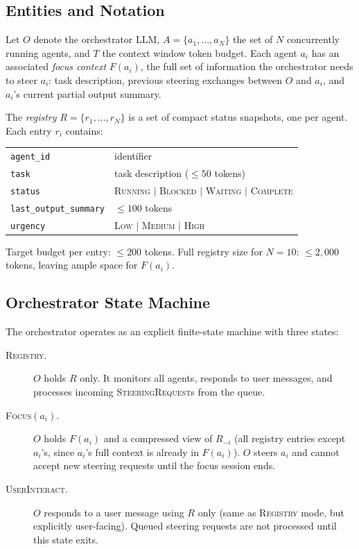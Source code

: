\documentclass{article}
\begin{document}
\subsection{Entities and Notation}
\label{sec:notation}

Let $O$ denote the orchestrator LLM, $A = \{a_1, \ldots, a_N\}$ the set
of $N$ concurrently running agents, and $T$ the context window token
budget.
Each agent $a_i$ has an associated \emph{focus context}
$F(a_i)$, the full set of information the orchestrator needs to steer
$a_i$: task description, previous steering exchanges between $O$ and
$a_i$, and $a_i$'s current partial output summary.

The \emph{registry} $R = \{r_1, \ldots, r_N\}$ is a set of compact status
snapshots, one per agent.
Each entry $r_i$ contains:

\begin{center}
\begin{tabular}{ll}
\texttt{agent\_id} & identifier \\
\texttt{task} & task description ($\leq 50$ tokens) \\
\texttt{status} & \textsc{Running} $|$ \textsc{Blocked} $|$ \textsc{Waiting} $|$ \textsc{Complete} \\
\texttt{last\_output\_summary} & $\leq 100$ tokens \\
\texttt{urgency} & \textsc{Low} $|$ \textsc{Medium} $|$ \textsc{High} \\
\end{tabular}
\end{center}

Target budget per entry: $\leq 200$ tokens.
Full registry size for $N=10$: $\leq 2{,}000$ tokens, leaving ample space for $F(a_i)$.

\subsection{Orchestrator State Machine}
\label{sec:fsm}

The orchestrator operates as an explicit finite-state machine with three states:

\begin{description}
  \item[\textsc{Registry}.] $O$ holds $R$ only.
  It monitors all agents, responds to user messages, and processes
  incoming \textsc{SteeringRequest}s from the queue.

  \item[\textsc{Focus}$(a_i)$.] $O$ holds $F(a_i)$ and a compressed view
  of $R_{-i}$ (all registry entries except $a_i$'s, since $a_i$'s full
  context is already in $F(a_i)$).
  $O$ steers $a_i$ and cannot accept new steering requests until the
  focus session ends.

  \item[\textsc{UserInteract}.] $O$ responds to a user message using $R$
  only (same as \textsc{Registry} mode, but explicitly user-facing).
  Queued steering requests are not processed until this state exits.
\end{description}
\end{document}
